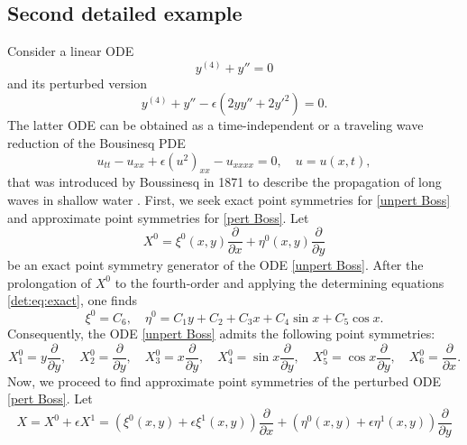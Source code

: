 \documentclass[11pt,letter,subeqn]{article}
\begin{document}
\subsection{Second detailed example}\label{sec:6:4}
  Consider a linear ODE
  \begin{equation}\label{unpert Boss}
    y^{(4)}+y''=0
  \end{equation}
and its perturbed version
  \begin{equation}\label{pert Boss}
  y^{(4)}+y''-\epsilon \left(2yy''+2y'^2\right)=0.
  \end{equation}
The latter ODE can be obtained as a time-independent or a traveling wave reduction of the Bousinesq PDE
\begin{equation}\label{BoussPDE}
  u_{tt}-u_{xx}+\epsilon (u^2)_{xx}-u_{xxxx}=0,\quad u=u(x,t),
\end{equation}
that was introduced by Boussinesq in 1871 to describe the propagation of long waves in shallow water \cite{clarksonz1989}.
First, we seek exact point symmetries for \eqref{unpert Boss} and approximate point symmetries for \eqref{pert Boss}. Let
\begin{equation}\label{exact Boss}
  X^0=\xi^0(x,y)\dfrac{\partial}{\partial x}+ \eta^0(x,y) \dfrac{\partial}{\partial y}
\end{equation}
    be an exact point symmetry generator of the ODE \eqref{unpert Boss}. After the prolongation of $X^0$ to the fourth-order and applying the determining equations
    \eqref{det:eq:exact}, one finds
    \begin{equation}\label{}
       \xi^0 = C_6,\quad \eta^0 = C_1y+C_2+C_3x+C_4\sin x+C_5 \cos x.
    \end{equation}
    Consequently, the ODE \eqref{unpert Boss} admits the following point symmetries:
    \begin{equation}\label{point symm Boss}
      X_1^0 = y\dfrac{\partial}{\partial y},\quad X_2^0=\dfrac{\partial}{\partial y},\quad X_3^0= x\dfrac{\partial}{\partial
      y},\quad X_4^0 = \sin x\dfrac{\partial}{\partial y},\quad X_5^0=\cos x\dfrac{\partial}{\partial
y},\quad X_6^0= \dfrac{\partial}{\partial x}.
    \end{equation}
    Now, we proceed to find approximate point symmetries of the perturbed
    ODE \eqref{pert Boss}. Let
    \begin{equation}\label{}
      X = X^0+\epsilon X^1 = \left(\xi^0(x,y)+\epsilon \xi^1(x,y)\right)\dfrac{\partial}{\partial x}+ \left(\eta^0(x,y)+\epsilon \eta^1(x,y)\right) \dfrac{\partial}{\partial y}
    \end{equation}
\end{document}
